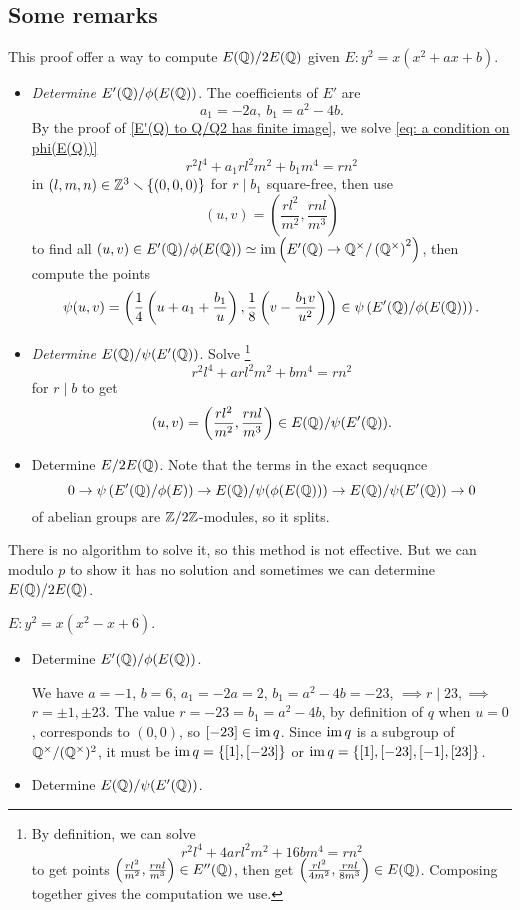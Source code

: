 \subsection*{Some remarks}
This proof offer a way to compute $E(\mathbb{Q})/2 E(\mathbb{Q})$
given $E : y^2 = x(x^2 + ax+b)$.
\begin{itemize}
\item \textit{Determine $E'(\mathbb{Q})/\phi(E(\mathbb{Q}))$}.
The coefficients of $E'$ are \[a_1 = -2a,\ b_1 = a^2 - 4b.\]
By the proof of \cref{E'(Q) to Q/Q2 has finite image}, we solve \cref{eq: a condition on phi(E(Q))}
\[r^2l^4 + a_1rl^2m^2 + b_1m^4 = rn^2\]
in $(l, m, n)\in\mathbb{Z}^3\smallsetminus\{(0, 0, 0)\}$
for $r\mid b_1$ square-free,
then use \[(u, v) = \left( \frac{rl^2}{m^2}, \frac{rnl}{m^3} \right)\] to find all $(u, v)\in E'(\mathbb{Q})/\phi(E(\mathbb{Q})) \simeq \operatorname{im} \left( E'(\mathbb{Q})\to \mathbb{Q}^\times/\left( \mathbb{Q}^\times \right)^2 \right)$,
then compute the points \[\psi(u, v) = \left( \frac{1}{4}\left( u + a_1 + \frac{b_1}{u} \right), \frac{1}{8}\left( v - \frac{b_1v}{u^2} \right) \right)\in\psi\left( E'(\mathbb{Q})/\phi(E(\mathbb{Q})) \right).\]
\item \textit{Determine $E(\mathbb{Q})/\psi(E'(\mathbb{Q}))$}.
Solve \footnote{
    By definition, we can solve
    \[r^2l^4 + 4arl^2m^2 + 16bm^4 = rn^2\]
    to get points $ \left( \frac{rl^2}{m^2}, \frac{rnl}{m^3} \right)\in E''(\mathbb{Q})$,
    then get $\left( \frac{rl^2}{4m^2}, \frac{rnl}{8m^3} \right)\in E(\mathbb{Q})$.
    Composing together gives the computation we use.
}
\[r^2l^4 + arl^2m^2 + bm^4 = rn^2\]
for $r\mid b$ to get \[(u, v) = \left( \frac{rl^2}{m^2}, \frac{rnl}{m^3} \right)\in E(\mathbb{Q})/\psi(E'(\mathbb{Q})).\]
\item Determine $E/2E(\mathbb{Q})$.
Note that the terms in the exact sequqnce
\[0\to \psi\left( E'(\mathbb{Q})/\phi(E) \right)\to E(\mathbb{Q})/\psi(\phi(E(\mathbb{Q})))\to E(\mathbb{Q})/\psi(E'(\mathbb{Q}))\to 0\]
of abelian groups are $\mathbb{Z}/2\mathbb{Z}$-modules,
so it splits.

\end{itemize}


There is no algorithm to solve it, so this method is not effective.
But we can modulo $p$ to show it has no solution and sometimes we can determine $E(\mathbb{Q})/2E(\mathbb{Q})$.
\begin{example}
    $E : y^2 = x(x^2 - x + 6)$.
\begin{itemize}
\item Determine $E'(\mathbb{Q})/\phi(E(\mathbb{Q}))$.\par
We have $a = -1$, $b = 6$, $a_1 = -2a = 2$, $b_1 = a^2 - 4b = -23$,
$\implies r\mid 23,\implies$
$r = \pm1,\pm 23$.
The value $r = -23 = b_1 = a^2 - 4b$, by definition of $q$ when $u = 0$,
corresponds to $(0, 0)$, so $[-23]\in\operatorname{im} q$.
Since $\operatorname{im} q$ is a subgroup of $\mathbb{Q}^\times/(\mathbb{Q}^\times)^2$,
it must be $\operatorname{im} q = \{[1], [-23]\}$ or $\operatorname{im} q = \{[1], [-23], [-1], [23]\}$.


\item Determine $E(\mathbb{Q})/\psi(E'(\mathbb{Q}))$.



\end{itemize}
    
\end{example}








